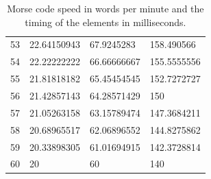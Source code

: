 \documentclass[a4paper]{tufte-handout}
\begin{document}
\begin{table}[!h]
\begin{tabular}{llll}
            53 & 22.64150943 & 67.9245283 & 158.490566 \\
            54 & 22.22222222 & 66.66666667 & 155.5555556 \\
            55 & 21.81818182 & 65.45454545 & 152.7272727 \\
            56 & 21.42857143 & 64.28571429 & 150 \\
            57 & 21.05263158 & 63.15789474 & 147.3684211 \\
            58 & 20.68965517 & 62.06896552 & 144.8275862 \\
            59 & 20.33898305 & 61.01694915 & 142.3728814 \\
            60 & 20 & 60 & 140 \\
            \bottomrule
        \end{tabular}
        \caption{Morse code speed in words per minute and the timing of the elements in milliseconds.}
        \label{tab:normaltab}
    \end{table}

\pagebreak


\end{document}
